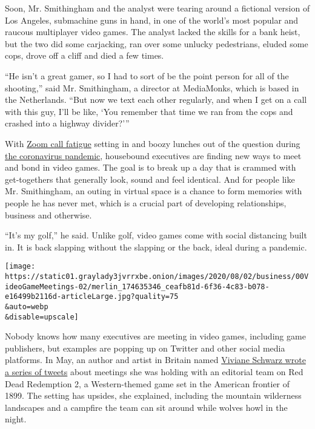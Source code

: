 Soon, Mr. Smithingham and the analyst were tearing around a fictional
version of Los Angeles, submachine guns in hand, in one of the world's
most popular and raucous multiplayer video games. The analyst lacked the
skills for a bank heist, but the two did some carjacking, ran over some
unlucky pedestrians, eluded some cops, drove off a cliff and died a few
times.

``He isn't a great gamer, so I had to sort of be the point person for
all of the shooting,'' said Mr. Smithingham, a director at MediaMonks,
which is based in the Netherlands. ``But now we text each other
regularly, and when I get on a call with this guy, I'll be like, `You
remember that time we ran from the cops and crashed into a highway
divider?'''

With
\href{https://www.nytimes3xbfgragh.onion/2020/05/20/smarter-living/coronavirus-zoom-facetime-fatigue.html}{Zoom
call fatigue} setting in and boozy lunches out of the question during
\href{https://www.nytimes3xbfgragh.onion/news-event/coronavirus}{the
coronavirus pandemic}, housebound executives are finding new ways to
meet and bond in video games. The goal is to break up a day that is
crammed with get-togethers that generally look, sound and feel
identical. And for people like Mr. Smithingham, an outing in virtual
space is a chance to form memories with people he has never met, which
is a crucial part of developing relationships, business and otherwise.

``It's my golf,'' he said. Unlike golf, video games come with social
distancing built in. It is back slapping without the slapping or the
back, ideal during a pandemic.

\texttt{[image: https://static01.graylady3jvrrxbe.onion/images/2020/08/02/business/00VideoGameMeetings-02/merlin\_174635346\_ceafb81d-6f36-4c83-b078-e16499b2116d-articleLarge.jpg?quality=75\\\&auto=webp\\\&disable=upscale]}

Nobody knows how many executives are meeting in video games, including
game publishers, but examples are popping up on Twitter and other social
media platforms. In May, an author and artist in Britain named
\href{https://twitter.com/vivschwarz/status/1261575801008504832}{Viviane
Schwarz wrote a series of tweets} about meetings she was holding with an
editorial team on Red Dead Redemption 2, a Western-themed game set in
the American frontier of 1899. The setting has upsides, she explained,
including the mountain wilderness landscapes and a campfire the team can
sit around while wolves howl in the night.

